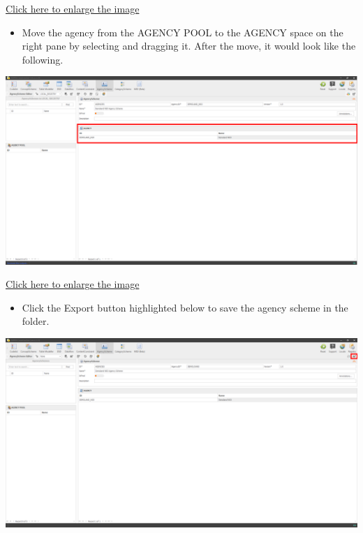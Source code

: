 \documentclass[
]{book}
\providecommand{\tightlist}{%
  \setlength{\itemsep}{0pt}\setlength{\parskip}{0pt}}
\begin{document}
\href{images/image068.png}{Click here to enlarge the image}

\begin{itemize}
\tightlist
\item
  Move the agency from the AGENCY POOL to the AGENCY space on the right pane by selecting and dragging it. After the move, it would look like the following.
\end{itemize}

\begin{center}\includegraphics[width=1\linewidth]{./images/image070} \end{center}

\href{images/image070.png}{Click here to enlarge the image}

\begin{itemize}
\tightlist
\item
  Click the Export button highlighted below to save the agency scheme in the folder.
\end{itemize}

\begin{center}\includegraphics[width=1\linewidth]{./images/image072} \end{center}
\end{document}
